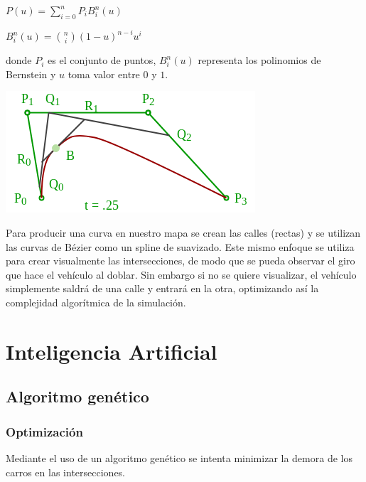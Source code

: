 \documentclass[colorinlistoftodos,twoside,twocolumn]{article} %
\begin{document}
	\begin{center}
		$ P(u) = \sum_{i=0}^{n} P_{i}B_{i}^{n}(u) $
	\end{center}
	\begin{center}
		$ B_{i}^{n}(u) = \binom{n}{i} (1 - u)^{n-i}u^{i} $
	\end{center}
	donde $ P_{i} $ es el conjunto de puntos, $ B_{i}^{n}(u) $ representa los polinomios de Bernstein y $ u $ toma valor entre $ 0 $ y $ 1 $.
	
	\begin{center}
		\includegraphics[width=\columnwidth]{Cubic-Bezier-Curve-Diagram}
	\end{center}
	
	Para producir una curva en nuestro mapa se crean las calles (rectas) y se utilizan las curvas de B\'ezier como un spline de suavizado. Este mismo enfoque se utiliza para crear visualmente las intersecciones, de modo que se pueda observar el giro que hace el veh\'iculo al doblar. Sin embargo si no se quiere visualizar, el veh\'iculo simplemente saldr\'a de una calle y entrar\'a en la otra, optimizando as\'i la complejidad algor\'itmica de la simulaci\'on.
	
	\section{Inteligencia Artificial}
	
	\subsection{Algoritmo genético}
	
	\subsubsection{Optimizaci\'on}
	
	Mediante el uso de un algoritmo gen\'etico se intenta minimizar la demora de los carros en las intersecciones. 
	
\end{document}
